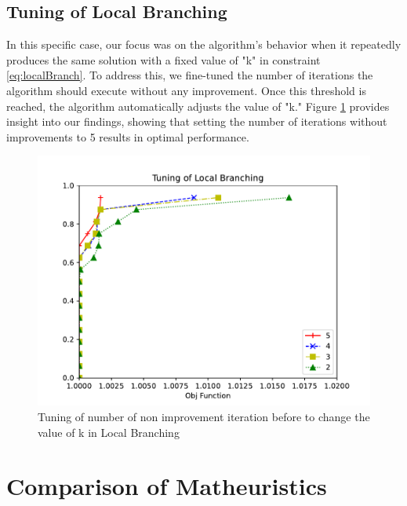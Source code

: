 \subsection{Tuning of Local Branching}
In this specific case, our focus was on the algorithm's behavior when it repeatedly produces the same solution with a fixed value of "k" in constraint \ref{eq:localBranch}. To address this, we fine-tuned the number of iterations the algorithm should execute without any improvement. Once this threshold is reached, the algorithm automatically adjusts the value of "k." Figure \ref{fig:soft} provides insight into our findings, showing that setting the number of iterations without improvements to 5 results in optimal performance.
\begin{figure}[!h]
    \centering
    \includegraphics[width=\textwidth]{images/soft.pdf}
    \caption{Tuning of number of non improvement iteration before to change the value of k in Local Branching}
    \label{fig:soft}
\end{figure}


\section{Comparison of Matheuristics}

